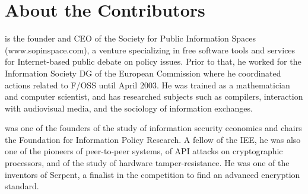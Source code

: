 \documentclass{mitpress}
\begin{document}
\section*{About the Contributors}

 is the founder and CEO of the Society for Public Information
Spaces (www.sopinspace.com), a venture specializing in free software
tools and services for Internet-based public debate on policy issues.
Prior to that, he worked for the Information Society DG of the European
Commission where he coordinated actions related to F/OSS until April
2003. He was trained as a mathematician and computer scientist, and has
researched subjects such as compilers, interaction with audiovisual media,
and the sociology of information exchanges.

 was one of the founders of the study of information security
economics and chairs the Foundation for Information Policy Research.
A fellow of the IEE, he was also one of the pioneers of peer-to-peer systems,
of API attacks on cryptographic processors, and of the study of hardware
tamper-resistance. He was one of the inventors of Serpent, a finalist in the
competition to find an advanced encryption standard. 








\printindex
\end{document}
